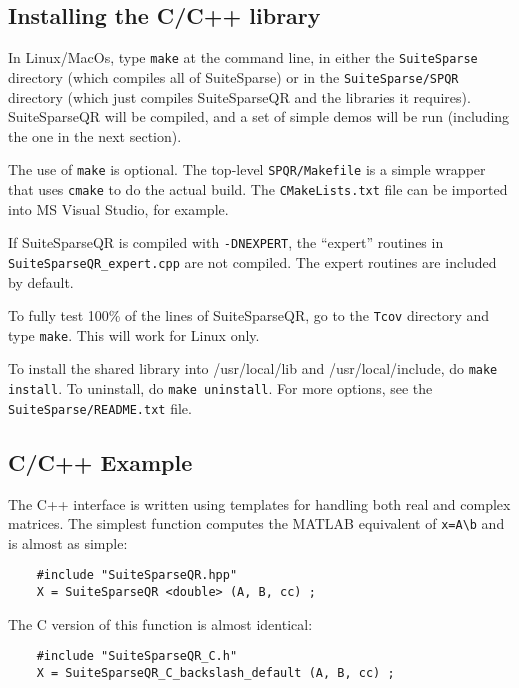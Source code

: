 \documentclass[12pt]{article}
\begin{document}
\subsection{Installing the C/C++ library}

In Linux/MacOs, type \verb'make' at
the command line, in either the \verb'SuiteSparse' directory (which
compiles all of SuiteSparse) or in the \verb'SuiteSparse/SPQR' directory (which
just compiles SuiteSparseQR and the libraries it requires).  SuiteSparseQR will
be compiled, and a set of simple demos will be run (including the one in the
next section).

The use of \verb'make' is optional.  The top-level \verb'SPQR/Makefile' is
a simple wrapper that uses \verb'cmake' to do the actual build.
The \verb'CMakeLists.txt' file can be imported into MS Visual Studio,
for example.

If SuiteSparseQR is compiled with \verb'-DNEXPERT', the ``expert'' routines in
\verb'SuiteSparseQR_expert.cpp' are not compiled.  The expert routines are
included by default.

To fully test 100\% of the lines of SuiteSparseQR, go to the \verb'Tcov'
directory and type \verb'make'.  This will work for Linux only.

To install the shared library
into /usr/local/lib and /usr/local/include, do {\tt make install}.
To uninstall, do {\tt make uninstall}.
For more options, see the {\tt SuiteSparse/README.txt} file.

\subsection{C/C++ Example}

The C++ interface is written using templates for handling both real and complex
matrices.  The simplest function computes the MATLAB equivalent of
\verb'x=A\b' and is almost as simple:
{\footnotesize
\begin{verbatim}
    #include "SuiteSparseQR.hpp"
    X = SuiteSparseQR <double> (A, B, cc) ;
\end{verbatim}
}
The C version of this function is almost identical:
{\footnotesize
\begin{verbatim}
    #include "SuiteSparseQR_C.h"
    X = SuiteSparseQR_C_backslash_default (A, B, cc) ;
\end{verbatim}
}
\end{document}
